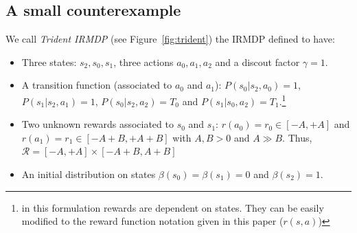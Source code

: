 \subsection{A small counterexample}\label{sec:counter}

We call \textit{Trident IRMDP} (see Figure~\ref{fig:trident}) the IRMDP defined to have:
\begin{itemize}
\item Three states: $s_2, s_0, s_1$, three actions $a_0, a_1, a_2$ and a discout factor $\gamma=1$.
\item A transition function (associated to $a_0$ and $a_1$): $P(s_0 | s_2,a_0)=1$, $P(s_1 |s_2 ,a_1)=1$, $P(s_0 | s_2, a_2) = T_0$ and $P(s_1 | s_0, a_2) = T_1$.\footnote{in this formulation rewards are dependent on states. They can be easily modified to the reward function notation given in this paper ($r(s, a)$)} 	 
\item Two unknown rewards associated to $s_0$ and $s_1$: $r(a_0)= r_0 \in [-A,+A]$ and $r(a_1)= r_1 \in [-A+B,+A+B]$ with $A,B > 0$ and $A \gg B$. Thus, $\mathcal{R} = [-A, +A]\times[-A+B, A+B]$
\item An initial distribution on states $\beta(s_0)= \beta(s_1) = 0$ and $\beta(s_2)=1$.

\end{itemize} 

